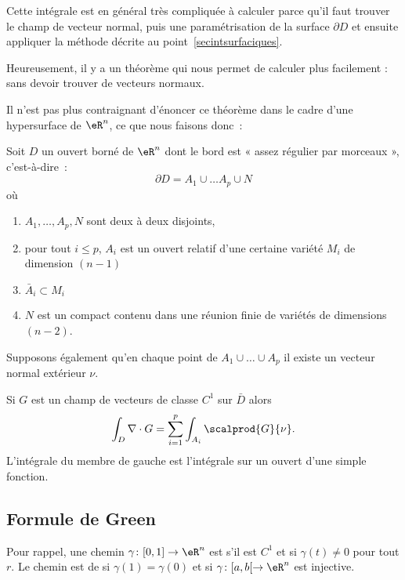 Cette intégrale est en général très compliquée à calculer parce qu'il faut trouver le champ de vecteur normal, puis une paramétrisation de la surface $\partial D$ et ensuite appliquer la méthode décrite au point~\ref{secintsurfaciques}.

Heureusement, il y a un théorème qui nous permet de calculer plus facilement : sans devoir trouver de vecteurs normaux.

Il n'est pas plus contraignant d'énoncer ce théorème dans le cadre d'une hypersurface de $\eR^n$, ce que nous faisons donc~:
\begin{theorem}
	Soit $D$ un ouvert borné de $\eR^n$ dont le bord est « assez régulier par morceaux », c'est-à-dire~:
	\begin{equation}
		\partial D = A_1 \cup \ldots A_p \cup N
	\end{equation}
	où
	\begin{enumerate}
		\item $A_1, \ldots, A_p, N$ sont deux à deux disjoints,
		\item pour tout $i \leq p$, $A_i$ est un ouvert relatif d'une certaine variété $M_i$ de dimension $(n-1)$
		\item $\bar A_i \subset M_i$
		\item $N$ est un compact contenu dans une réunion finie de variétés de dimensions $(n-2)$.
	\end{enumerate}
	Supposons également qu'en chaque point de $A_1 \cup \ldots \cup A_p$ il existe un vecteur normal extérieur $\nu$.

	Si $G$ est un champ de vecteurs de classe $C^1$ sur $\bar D$ alors
	\begin{equation}
		\int_D \nabla\cdot G = \sum_{i=1}^p \int_{A_i} \scalprod{G}{\nu}.
	\end{equation}
	L'intégrale du membre de gauche est l'intégrale sur un ouvert d'une simple fonction.
\end{theorem}

\subsection{Formule de Green}

Pour rappel, une chemin $\gamma\colon \mathopen[ 0 , 1 \mathclose]\to \eR^n$ est  s'il est $C^1$ et si $\gamma(t)\neq 0$ pour tout $r$. Le chemin est de  si $\gamma(1)=\gamma(0)$ et si $\gamma\colon \mathopen[ a , b [\to \eR^n$ est injective.

